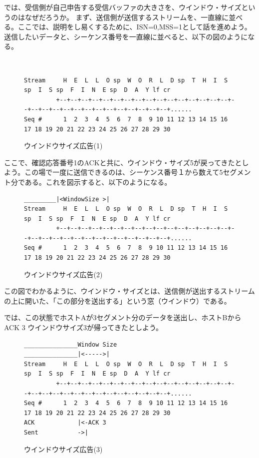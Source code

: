 では、受信側が自己申告する受信バッファの大きさを、ウインドウ・サイズというのはなぜだろうか。
まず、送信側が送信するストリームを、一直線に並べる。ここでは、説明をし易くするために、ISN=0,MSS=1として話を進めよう。送信したいデータと、シーケンス番号を一直線に並べると、以下の図のようになる。

\begin{figure}[h!] \caption{ウインドウサイズ広告(1)}　\label{windowsize1}
\begin{center}
{\scriptsize
\begin{verbatim}
Stream     H  E  L  L  O sp  W  O  R  L  D sp  T  H  I  S sp  I  S sp  F  I  N  E sp  D  A  Y lf cr              
         +--+--+--+--+--+--+--+--+--+--+--+--+--+--+--+--+--+--+--+--+--+--+--+--+--+--+--+--+--+--+......
Seq #      1  2  3  4  5  6  7  8  9 10 11 12 13 14 15 16 17 18 19 20 21 22 23 24 25 26 27 28 29 30  
\end{verbatim}
}
\end{center}
\end{figure}

ここで、確認応答番号1のACKと共に、ウインドウ・サイズ5が戻ってきたとしよう。この場で一度に送信できるのは、シーケンス番号１から数えて5セグメント分である。これを図示すると、以下のようになる。

\begin{figure}[h!] \caption{ウインドウサイズ広告(2)} \label{windowsize2}
\begin{center}
{\scriptsize
\begin{verbatim}
_________|<WindowSize >|      
Stream     H  E  L  L  O sp  W  O  R  L  D sp  T  H  I  S sp  I  S sp  F  I  N  E sp  D  A  Y lf cr              
         +--+--+--+--+--+--+--+--+--+--+--+--+--+--+--+--+--+--+--+--+--+--+--+--+--+--+--+--+--+--+......
Seq #      1  2  3  4  5  6  7  8  9 10 11 12 13 14 15 16 17 18 19 20 21 22 23 24 25 26 27 28 29 30  
\end{verbatim}
}
\end{center}
\end{figure}

この図でわかるように、ウインドウ・サイズとは、送信側が送出するストリームの上に開いた、「この部分を送出する」という窓（ウインドウ）である。

では、この状態でホストAが3セグメント分のデータを送出し、ホストBからACK 3 ウインドウサイズ3が帰ってきたとしよう。

\begin{figure}[h!] \caption{ウインドウサイズ広告(3)} \label{windowsize3}
\begin{center}
{\scriptsize
\begin{verbatim}
_______________Window Size
_______________|<----->|      
Stream     H  E  L  L  O sp  W  O  R  L  D sp  T  H  I  S sp  I  S sp  F  I  N  E sp  D  A  Y lf cr              
         +--+--+--+--+--+--+--+--+--+--+--+--+--+--+--+--+--+--+--+--+--+--+--+--+--+--+--+--+--+--+......
Seq #      1  2  3  4  5  6  7  8  9 10 11 12 13 14 15 16 17 18 19 20 21 22 23 24 25 26 27 28 29 30
ACK            |<-ACK 3  
Sent           ->|
\end{verbatim}
}
\end{center}
\end{figure}

